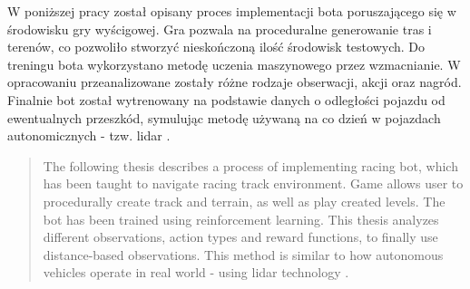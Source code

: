 \begin{streszczenie}
    W poniższej pracy został opisany proces implementacji bota poruszającego się w środowisku gry wyścigowej. Gra pozwala na proceduralne generowanie tras i terenów, co pozwoliło stworzyć nieskończoną ilość środowisk testowych. Do treningu bota wykorzystano metodę uczenia maszynowego przez wzmacnianie. W opracowaniu przeanalizowane zostały różne rodzaje obserwacji, akcji oraz nagród. Finalnie bot został wytrenowany na podstawie danych o odległości pojazdu od ewentualnych przeszkód, symulując metodę używaną na co dzień w pojazdach autonomicznych - tzw. lidar \cite{Lidar}.
\end{streszczenie}

\vspace*{1cm}

\begin{abstract}
    The following thesis describes a process of implementing racing bot, which has been taught to navigate racing track environment. Game allows user to procedurally create track and terrain, as well as play created levels. The bot has been trained using reinforcement learning. This thesis analyzes different observations, action types and reward functions, to finally use distance-based observations. This method is similar to how autonomous vehicles operate in real world - using lidar technology \cite{Lidar}.
\end{abstract}